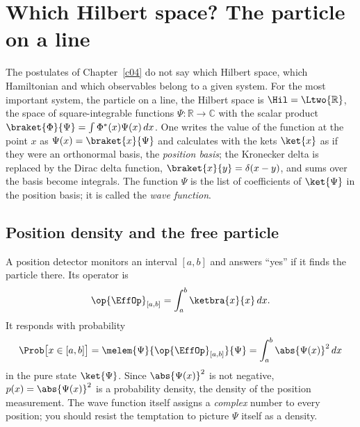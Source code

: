 %

\chapter{Which Hilbert space? The particle on a line}\label{c05}

The postulates of Chapter~\ref{c04} do not say which Hilbert space, which Hamiltonian and which
observables belong to a given system. For the most important system, the particle on a line,
the Hilbert space is $\Hil = \Ltwo{\mathbb{R}}$, the space of square-integrable functions
$\Psi\colon \mathbb{R} \to \mathbb{C}$ with the scalar product
$\braket{\Phi}{\Psi} = \int \Phi^*(x)\Psi(x)\,dx$. One writes the value of the function at the
point $x$ as $\Psi(x) = \braket{x}{\Psi}$ and calculates with the kets $\ket{x}$ as if they were
an orthonormal basis, the \emph{position basis}; the Kronecker delta is replaced by the Dirac
delta function, $\braket{x}{y} = \delta(x-y)$, and sums over the basis become integrals. The
function $\Psi$ is the list of coefficients of $\ket{\Psi}$ in the position basis; it is called
the \emph{wave function}.

\section{Position density and the free particle}\label{c05.s1}

A position detector monitors an interval $[a,b]$ and answers “yes” if it finds the particle
there. Its operator is
\begin{equation}\label{c05.eq.ortsdetektor}
  \op{\EffOp}_{[a,b]} = \int_a^b \ketbra{x}{x}\,dx .
\end{equation}
It responds with probability
\begin{equation}\label{c05.eq.intervall}
  \Prob\bigl[x\in[a,b]\bigr] = \melem{\Psi}{\op{\EffOp}_{[a,b]}}{\Psi}
  = \int_a^b \abs{\Psi(x)}^2\,dx
\end{equation}
in the pure state $\ket{\Psi}$. Since $\abs{\Psi(x)}^2$ is not negative, $p(x) = \abs{\Psi(x)}^2$ is a probability density, the
density of the position measurement. The wave function itself assigns a \emph{complex} number
to every position; you should resist the temptation to picture $\Psi$ itself as a density.

